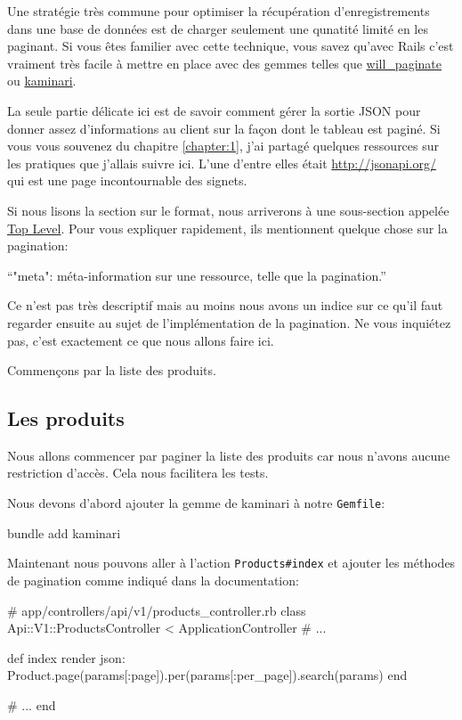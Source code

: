 \documentclass[]{report}
\begin{document}
    Une stratégie très commune pour optimiser la récupération d'enregistrements dans une base de données est de charger seulement une qunatité limité en les paginant. Si vous êtes familier avec cette technique, vous savez qu'avec Rails c'est vraiment très facile à mettre en place avec des gemmes telles que \href{https://github.com/mislav/will_paginate}{will\_paginate} ou \href{https://github.com/kaminari/kaminari}{kaminari}.

    La seule partie délicate ici est de savoir comment gérer la sortie JSON pour donner assez d'informations au client sur la façon dont le tableau est paginé. Si vous vous souvenez du chapitre \ref{chapter:1}, j'ai partagé quelques ressources sur les pratiques que j'allais suivre ici. L'une d'entre elles était \url{http://jsonapi.org/} qui est une page incontournable des signets.

    Si nous lisons la section sur le format, nous arriverons à une sous-section appelée \href{https://jsonapi.org/format/#document-top-level}{Top Level}. Pour vous expliquer rapidement, ils mentionnent quelque chose sur la pagination:

    \enquote{"meta": méta-information sur une ressource, telle que la pagination.}

    Ce n'est pas très descriptif mais au moins nous avons un indice sur ce qu'il faut regarder ensuite au sujet de l'implémentation de la pagination. Ne vous inquiétez pas, c'est exactement ce que nous allons faire ici.

    Commençons par la liste des produits.


    \subsection{Les produits}

      Nous allons commencer par paginer la liste des produits car nous n'avons aucune restriction d'accès. Cela nous facilitera les tests.

      Nous devons d'abord ajouter la gemme de kaminari à notre \verb|Gemfile|:

      \begin{bashcode}
      bundle add kaminari
      \end{bashcode}

      Maintenant nous pouvons aller à l'action \verb|Products#index| et ajouter les méthodes de pagination comme indiqué dans la documentation:

      \begin{rubycode}
      # app/controllers/api/v1/products_controller.rb
      class Api::V1::ProductsController < ApplicationController
        # ...

        def index
          render json: Product.page(params[:page]).per(params[:per_page]).search(params)
        end

        # ...
      end
      \end{rubycode}
\end{document}
